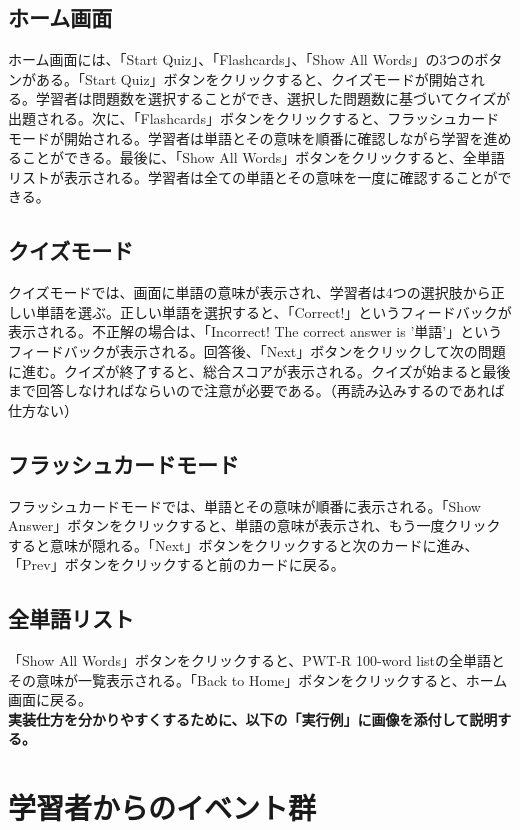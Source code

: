 \documentclass[]{jsarticle}
\begin{document}
\subsection{ホーム画面}
ホーム画面には、「Start Quiz」、「Flashcards」、「Show All Words」の3つのボタンがある。「Start Quiz」ボタンをクリックすると、クイズモードが開始される。学習者は問題数を選択することができ、選択した問題数に基づいてクイズが出題される。次に、「Flashcards」ボタンをクリックすると、フラッシュカードモードが開始される。学習者は単語とその意味を順番に確認しながら学習を進めることができる。最後に、「Show All Words」ボタンをクリックすると、全単語リストが表示される。学習者は全ての単語とその意味を一度に確認することができる。

\subsection{クイズモード}
クイズモードでは、画面に単語の意味が表示され、学習者は4つの選択肢から正しい単語を選ぶ。正しい単語を選択すると、「Correct!」というフィードバックが表示される。不正解の場合は、「Incorrect! The correct answer is '単語'」というフィードバックが表示される。回答後、「Next」ボタンをクリックして次の問題に進む。クイズが終了すると、総合スコアが表示される。クイズが始まると最後まで回答しなければならいので注意が必要である。（再読み込みするのであれば仕方ない）

\subsection{フラッシュカードモード}
フラッシュカードモードでは、単語とその意味が順番に表示される。「Show Answer」ボタンをクリックすると、単語の意味が表示され、もう一度クリックすると意味が隠れる。「Next」ボタンをクリックすると次のカードに進み、「Prev」ボタンをクリックすると前のカードに戻る。

\subsection{全単語リスト}
「Show All Words」ボタンをクリックすると、PWT-R 100-word listの全単語とその意味が一覧表示される。「Back to Home」ボタンをクリックすると、ホーム画面に戻る。\\
\newline
\textbf{実装仕方を分かりやすくするために、以下の「実行例」に画像を添付して説明する。}

\newpage
\section{学習者からのイベント群}
\end{document}
